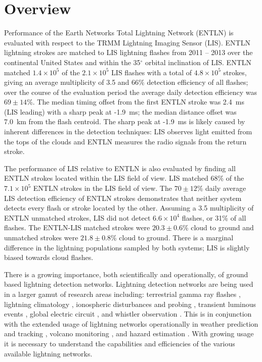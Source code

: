 \section{Overview}

Performance of the Earth Networks Total Lightning Network (ENTLN) is evaluated with respect to the TRMM Lightning Imaging Sensor (LIS).
ENTLN lightning strokes are matched to LIS lightning flashes from 2011 -- 2013 over the continental United States and within the 35$^\circ$ orbital inclination of LIS.
ENTLN matched $1.4\times10^5$ of the $2.1\times10^5$ LIS flashes with a total of $4.8\times10^5$ strokes, giving an average multiplicity of 3.5 and 66\% detection efficiency of all flashes; over the course of the evaluation period the average daily detection efficiency was $69\pm14$\%.
The median timing offset from the first ENTLN stroke was 2.4~ms (LIS leading) with a sharp peak at -1.9~ms; the median distance offset was 7.0~km from the flash centroid.
The sharp peak at -1.9~ms is likely caused by inherent differences in the detection techniques: LIS observes light emitted from the tops of the clouds and ENTLN measures the radio signals from the return stroke.

The performance of LIS relative to ENTLN is also evaluated by finding all ENTLN strokes located within the LIS field of view.
LIS matched 68\% of the $7.1\times10^5$ ENTLN strokes in the LIS field of view.
The $70 \pm 12$\% daily average LIS detection efficiency of ENTLN strokes demonstrates that neither system detects every flash or stroke located by the other.
Assuming a 3.5 multiplicity of ENTLN unmatched strokes, LIS did not detect $6.6\times10^4$ flashes, or 31\% of all flashes.
The ENTLN-LIS matched strokes were $20.3 \pm 0.6$\% cloud to ground and unmatched strokes were $21.8 \pm 0.8$\% cloud to ground.
There is a marginal difference in the lightning populations sampled by both systems;  LIS is slightly biased towards cloud flashes.

There is a growing importance, both scientifically and operationally, of ground based lightning detection networks.
Lightning detection networks are being used in a larger gamut of research areas including: terrestrial gamma ray flashes \citep{Dwyer2012, Gjesteland2011, Connaughton2010}, lightning climatology \citep{Virts2013, Virts2011a, Burgesser2012}, ionospheric disturbances and probing \citep{Jacobson2010, Singh2011}, transient luminous events \citep{Soula2011}, global electric circuit  \citep{Holzworth2005}, and whistler observation \citep{Collier2010, Collier2011a, Burkholder2013}.
This is in conjunction with the extended usage of lightning networks operationally in weather prediction and tracking \citep{Fierro2012, Pan2010, Thomas2010d}, volcano monitoring \citep{Doughton2010}, and hazard estimation \citep{Altaratz2010}.
With growing usage it is necessary to understand the capabilities and efficiencies of the various available lightning networks.

